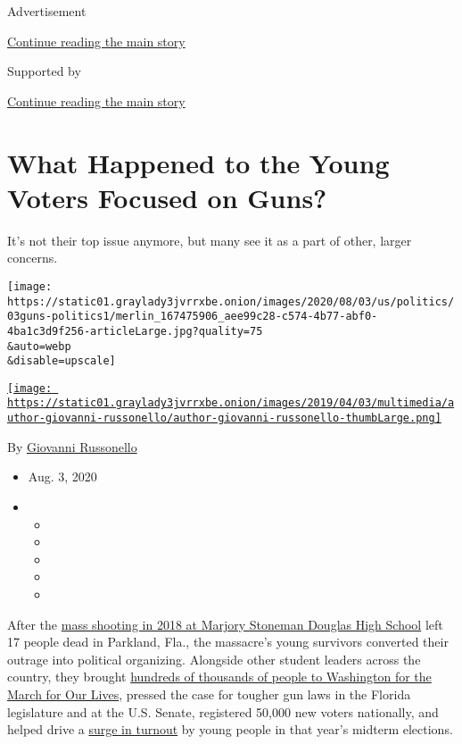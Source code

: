 Advertisement

\protect\hyperlink{after-top}{Continue reading the main story}

Supported by

\protect\hyperlink{after-sponsor}{Continue reading the main story}

\hypertarget{what-happened-to-the-young-voters-focused-on-guns}{%
\section{What Happened to the Young Voters Focused on
Guns?}\label{what-happened-to-the-young-voters-focused-on-guns}}

It's not their top issue anymore, but many see it as a part of other,
larger concerns.

\texttt{[image: https://static01.graylady3jvrrxbe.onion/images/2020/08/03/us/politics/03guns-politics1/merlin\_167475906\_aee99c28-c574-4b77-abf0-4ba1c3d9f256-articleLarge.jpg?quality=75\\\&auto=webp\\\&disable=upscale]}

\href{https://www.nytimes3xbfgragh.onion/by/giovanni-russonello}{\texttt{[image: https://static01.graylady3jvrrxbe.onion/images/2019/04/03/multimedia/author-giovanni-russonello/author-giovanni-russonello-thumbLarge.png]}}

By
\href{https://www.nytimes3xbfgragh.onion/by/giovanni-russonello}{Giovanni
Russonello}

\begin{itemize}
\item
  Aug. 3, 2020
\item
  \begin{itemize}
  \item
  \item
  \item
  \item
  \item
  \end{itemize}
\end{itemize}

After the
\href{https://www.nytimes3xbfgragh.onion/2019/02/13/us/parkland-anniversary-marjory-stoneman-douglas.html}{mass
shooting in 2018 at Marjory Stoneman Douglas High School} left 17 people
dead in Parkland, Fla., the massacre's young survivors converted their
outrage into political organizing. Alongside other student leaders
across the country, they brought
\href{https://www.nytimes3xbfgragh.onion/2018/03/24/us/march-for-our-lives.html}{hundreds
of thousands of people to Washington for the March for Our Lives},
pressed the case for tougher gun laws in the Florida legislature and at
the U.S. Senate, registered 50,000 new voters nationally, and helped
drive a
\href{https://www.nytimes3xbfgragh.onion/2018/11/07/us/elections-gun-control-florida.html}{surge
in turnout} by young people in that year's midterm elections.

